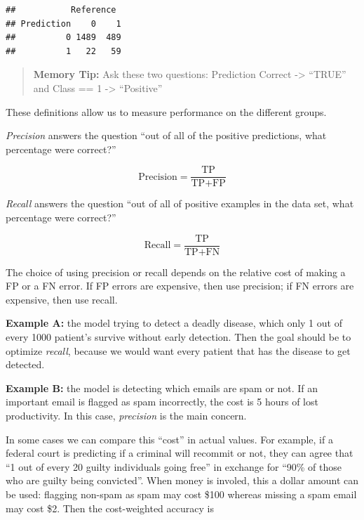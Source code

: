 \documentclass[]{book}
\newenvironment{Shaded}{\begin{snugshade}}{\end{snugshade}}
\newcommand{\KeywordTok}[1]{\textcolor[rgb]{0.13,0.29,0.53}{\textbf{#1}}}
\newcommand{\NormalTok}[1]{#1}
\newcommand{\OperatorTok}[1]{\textcolor[rgb]{0.81,0.36,0.00}{\textbf{#1}}}
\begin{document}
\begin{Shaded}
\end{Shaded}

\begin{verbatim}
##           Reference
## Prediction    0    1
##          0 1489  489
##          1   22   59
\end{verbatim}

\begin{quote}
\textbf{Memory Tip:} Ask these two questions: Prediction Correct -\textgreater{} ``TRUE'' and Class == 1 -\textgreater{} ``Positive''
\end{quote}

These definitions allow us to measure performance on the different groups.

\emph{Precision} answers the question ``out of all of the positive predictions, what percentage were correct?''

\[\text{Precision} = \frac{\text{TP}}{\text{TP} + \text{FP}}\]

\emph{Recall} answers the question ``out of all of positive examples in the data set, what percentage were correct?''

\[\text{Recall} = \frac{\text{TP}}{\text{TP} + \text{FN}}\]

The choice of using precision or recall depends on the relative cost of making a FP or a FN error. If FP errors are expensive, then use precision; if FN errors are expensive, then use recall.

\textbf{Example A:} the model trying to detect a deadly disease, which only 1 out of every 1000 patient's survive without early detection. Then the goal should be to optimize \emph{recall}, because we would want every patient that has the disease to get detected.

\textbf{Example B:} the model is detecting which emails are spam or not. If an important email is flagged as spam incorrectly, the cost is 5 hours of lost productivity. In this case, \emph{precision} is the main concern.

In some cases we can compare this ``cost'' in actual values. For example, if a federal court is predicting if a criminal will recommit or not, they can agree that ``1 out of every 20 guilty individuals going free'' in exchange for ``90\% of those who are guilty being convicted''. When money is involed, this a dollar amount can be used: flagging non-spam as spam may cost \$100 whereas missing a spam email may cost \$2. Then the cost-weighted accuracy is
\end{document}
